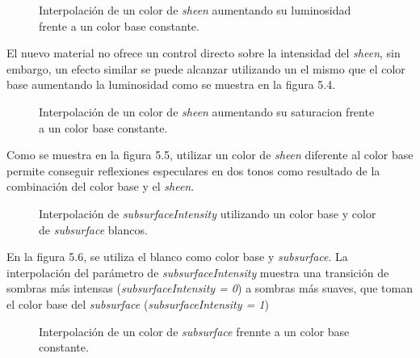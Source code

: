 \begin{figure}[H]
  \vspace{0.5cm}
  \centering
  \caption{Interpolaci\'on de un color de \textit{sheen} aumentando su luminosidad frente a un color base constante.}
\end{figure}

El nuevo material no ofrece un control directo sobre la intensidad del \textit{sheen}, sin embargo, un efecto similar se puede
alcanzar utilizando un el mismo que el color base aumentando la luminosidad como se muestra en la figura 5.4.

\begin{figure}[H]
  \vspace{0.5cm}
  \centering
  \caption{Interpolaci\'on de un color de \textit{sheen} aumentando su saturacion frente a un color base constante.}
\end{figure}
\singlespacing

Como se muestra en la figura 5.5, utilizar un color de \textit{sheen} diferente al color base permite conseguir reflexiones especulares
en dos tonos como resultado de la combinaci\'on del color base y el \textit{sheen}.

\begin{figure}[H]
  \vspace{0.5cm}
  \centering
    \caption{Interpolaci\'on de \textit{subsurfaceIntensity} utilizando un color base y color de \textit{subsurface} blancos.}
\end{figure}
\singlespacing

En la figura 5.6, se utiliza el blanco como color base y \textit{subsurface}. La interpolaci\'on del par\'ametro de \textit{subsurfaceIntensity}
muestra una transici\'on de sombras m\'as intensas (\textit{subsurfaceIntensity = 0}) a sombras m\'as suaves, que toman el color base del
\textit{subsurface} (\textit{subsurfaceIntensity = 1})\\



\begin{figure}[H]
  \vspace{0.5cm}
  \centering
    \caption{Interpolaci\'on de un color de \textit{subsurface} frennte a un color base constante.}
 \end{figure}
\singlespacing

